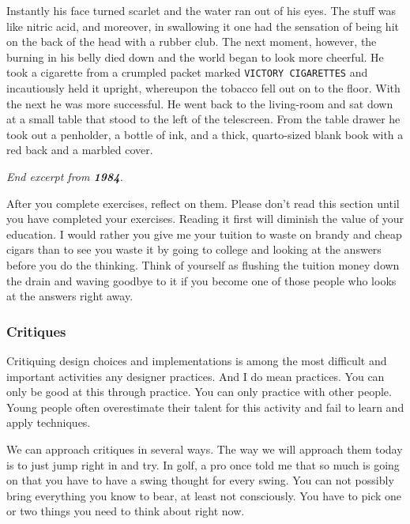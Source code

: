 Instantly his face turned scarlet and the water ran out of his eyes. The
stuff was like nitric acid, and moreover, in swallowing it one had the
sensation of being hit on the back of the head with a rubber club. The
next moment, however, the burning in his belly died down and the world
began to look more cheerful. He took a cigarette from a crumpled packet
marked \texttt{VICTORY\ CIGARETTES} and incautiously held it upright,
whereupon the tobacco fell out on to the floor. With the next he was
more successful. He went back to the living-room and sat down at a small
table that stood to the left of the telescreen. From the table drawer he
took out a penholder, a bottle of ink, and a thick, quarto-sized blank
book with a red back and a marbled cover.

\emph{End excerpt from \textbf{1984}.}

\hypertarget{exercise-reflection}{%
\label{exercise-reflection}}

After you complete exercises, reflect on them. Please don't read this
section until you have completed your exercises. Reading it first will
diminish the value of your education. I would rather you give me your
tuition to waste on brandy and cheap cigars than to see you waste it by
going to college and looking at the answers before you do the thinking.
Think of yourself as flushing the tuition money down the drain and
waving goodbye to it if you become one of those people who looks at the
answers right away.

\hypertarget{critiques}{%
\subsubsection{Critiques}\label{critiques}}

Critiquing design choices and implementations is among the most
difficult and important activities any designer practices. And I do mean
practices. You can only be good at this through practice. You can only
practice with other people. Young people often overestimate their talent
for this activity and fail to learn and apply techniques.

We can approach critiques in several ways. The way we will approach them
today is to just jump right in and try. In golf, a pro once told me that
so much is going on that you have to have a swing thought for every
swing. You can not possibly bring everything you know to bear, at least
not consciously. You have to pick one or two things you need to think
about right now.

